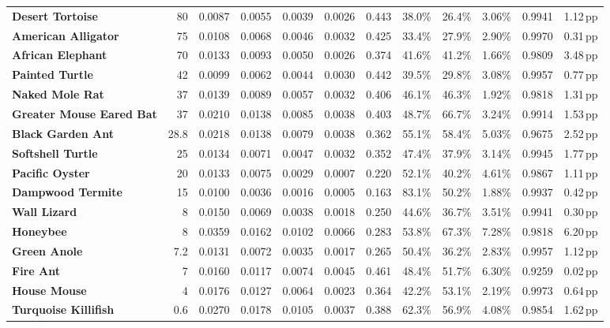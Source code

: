 \documentclass[11pt,a4paper]{article}
\renewcommand{\_}{\origunderscore\penalty200\relax}
\theoremstyle{remark}
\begin{document}
\begin{table}[H]
{{\begin{tabular}{lrrrrrrrrrrr}
\textbf{Desert Tortoise} & 80 & 0.0087 & 0.0055 & 0.0039 & 0.0026 & 0.443 & 38.0\% & 26.4\% & 3.06\% & 0.9941 & 1.12\,pp \\
\textbf{American Alligator} & 75 & 0.0108 & 0.0068 & 0.0046 & 0.0032 & 0.425 & 33.4\% & 27.9\% & 2.90\% & 0.9970 & 0.31\,pp \\
\textbf{African Elephant} & 70 & 0.0133 & 0.0093 & 0.0050 & 0.0026 & 0.374 & 41.6\% & 41.2\% & 1.66\% & 0.9809 & 3.48\,pp \\
\textbf{Painted Turtle} & 42 & 0.0099 & 0.0062 & 0.0044 & 0.0030 & 0.442 & 39.5\% & 29.8\% & 3.08\% & 0.9957 & 0.77\,pp \\
\textbf{Naked Mole Rat} & 37 & 0.0139 & 0.0089 & 0.0057 & 0.0032 & 0.406 & 46.1\% & 46.3\% & 1.92\% & 0.9818 & 1.31\,pp \\
\textbf{Greater Mouse Eared Bat} & 37 & 0.0210 & 0.0138 & 0.0085 & 0.0038 & 0.403 & 48.7\% & 66.7\% & 3.24\% & 0.9914 & 1.53\,pp \\
\textbf{Black Garden Ant} & 28.8 & 0.0218 & 0.0138 & 0.0079 & 0.0038 & 0.362 & 55.1\% & 58.4\% & 5.03\% & 0.9675 & 2.52\,pp \\
\textbf{Softshell Turtle} & 25 & 0.0134 & 0.0071 & 0.0047 & 0.0032 & 0.352 & 47.4\% & 37.9\% & 3.14\% & 0.9945 & 1.77\,pp \\
\textbf{Pacific Oyster} & 20 & 0.0133 & 0.0075 & 0.0029 & 0.0007 & 0.220 & 52.1\% & 40.2\% & 4.61\% & 0.9867 & 1.11\,pp \\
\textbf{Dampwood Termite} & 15 & 0.0100 & 0.0036 & 0.0016 & 0.0005 & 0.163 & 83.1\% & 50.2\% & 1.88\% & 0.9937 & 0.42\,pp \\
\textbf{Wall Lizard} & 8 & 0.0150 & 0.0069 & 0.0038 & 0.0018 & 0.250 & 44.6\% & 36.7\% & 3.51\% & 0.9941 & 0.30\,pp \\
\textbf{Honeybee} & 8 & 0.0359 & 0.0162 & 0.0102 & 0.0066 & 0.283 & 53.8\% & 67.3\% & 7.28\% & 0.9818 & 6.20\,pp \\
\textbf{Green Anole} & 7.2 & 0.0131 & 0.0072 & 0.0035 & 0.0017 & 0.265 & 50.4\% & 36.2\% & 2.83\% & 0.9957 & 1.12\,pp \\
\textbf{Fire Ant} & 7 & 0.0160 & 0.0117 & 0.0074 & 0.0045 & 0.461 & 48.4\% & 51.7\% & 6.30\% & 0.9259 & 0.02\,pp \\
\textbf{House Mouse} & 4 & 0.0176 & 0.0127 & 0.0064 & 0.0023 & 0.364 & 42.2\% & 53.1\% & 2.19\% & 0.9973 & 0.64\,pp \\
\textbf{Turquoise Killifish} & 0.6 & 0.0270 & 0.0178 & 0.0105 & 0.0037 & 0.388 & 62.3\% & 56.9\% & 4.08\% & 0.9854 & 1.62\,pp \\

\end{tabular}}}
\end{table}
\end{document}
